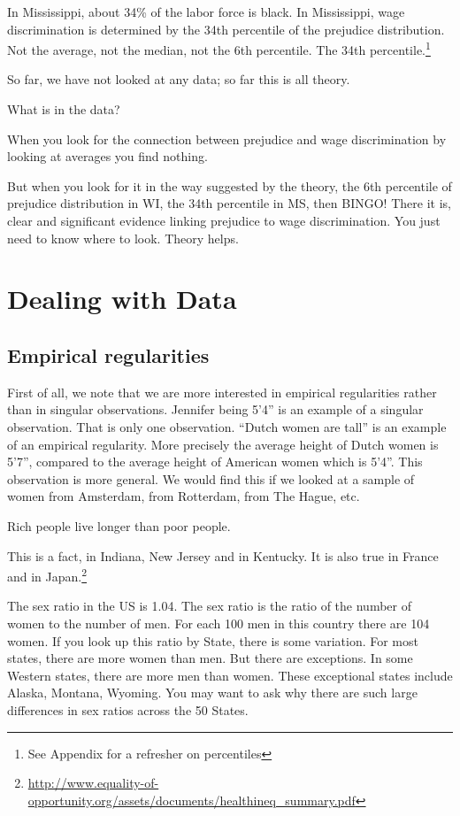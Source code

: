 \documentclass[
]{book}
\begin{document}
In Mississippi, about 34\% of the labor force is black. In Mississippi, wage discrimination is determined by the 34th percentile of the prejudice distribution. Not the average, not the median, not the 6th percentile. The 34th percentile.\footnote{See Appendix for a refresher on percentiles}

So far, we have not looked at any data; so far this is all theory.

What is in the data?

When you look for the connection between prejudice and wage discrimination by looking at averages you find nothing.

But when you look for it in the way suggested by the theory, the 6th percentile of prejudice distribution in WI, the 34th percentile in MS, then BINGO! There it is, clear and significant evidence linking prejudice to wage discrimination. You just need to know where to look. Theory helps.

\hypertarget{dealing-with-data}{%
\section{Dealing with Data}\label{dealing-with-data}}

\hypertarget{empirical-regularities}{%
\subsection{Empirical regularities}\label{empirical-regularities}}

First of all, we note that we are more interested in empirical regularities rather than in singular observations. Jennifer being 5'4'' is an example of a singular observation. That is only one observation. ``Dutch women are tall'' is an example of an empirical regularity. More precisely the average height of Dutch women is 5'7'', compared to the average height of American women which is 5'4''. This observation is more general. We would find this if we looked at a sample of women from Amsterdam, from Rotterdam, from The Hague, etc.

Rich people live longer than poor people.

This is a fact, in Indiana, New Jersey and in Kentucky. It is also true in France and in Japan.\footnote{\url{http://www.equality-of-opportunity.org/assets/documents/healthineq_summary.pdf}}

The sex ratio in the US is 1.04. The sex ratio is the ratio of the number of women to the number of men. For each 100 men in this country there are 104 women. If you look up this ratio by State, there is some variation. For most states, there are more women than men. But there are exceptions. In some Western states, there are more men than women. These exceptional states include Alaska, Montana, Wyoming. You may want to ask why there are such large differences in sex ratios across the 50 States.
\end{document}
